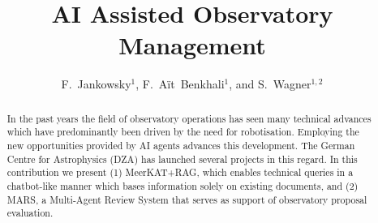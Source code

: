 \documentclass[11pt,twoside]{article}
\begin{document}
\title{AI Assisted Observatory Management}

\author{F.~Jankowsky$^1$, F.~Aït~Benkhali$^1$, and S.~Wagner$^{1,2}$}





\begin{abstract}
  In the past years the field of observatory operations has seen many technical advances which have predominantly been driven by the need for robotisation. Employing the new opportunities provided by AI agents advances this development. The German Centre for Astrophysics (DZA) has launched several projects in this regard. In this contribution we present (1) MeerKAT+RAG, which enables technical queries in a chatbot-like manner which bases information solely on existing documents, and (2) MARS, a Multi-Agent Review System that serves as support of observatory proposal evaluation.
\end{abstract}
\end{document}
